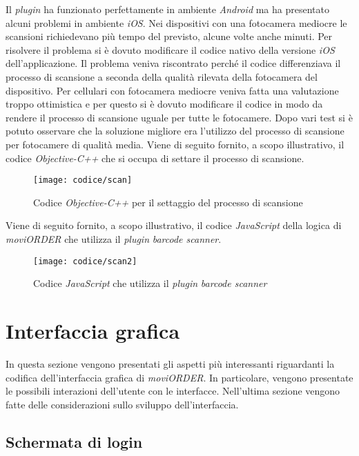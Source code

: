 Il \textit{plugin} ha funzionato perfettamente in ambiente \textit{Android} ma ha presentato alcuni problemi in ambiente \textit{iOS}. Nei dispositivi con una fotocamera mediocre le scansioni richiedevano più tempo del previsto, alcune volte anche minuti. Per risolvere il problema si è dovuto modificare il codice nativo della versione \textit{iOS} dell'applicazione. Il problema veniva riscontrato perché il codice differenziava il processo di scansione a seconda della qualità rilevata della fotocamera del dispositivo. Per cellulari con fotocamera mediocre veniva fatta una valutazione troppo ottimistica e per questo si è dovuto modificare il codice in modo da rendere il processo di scansione uguale per tutte le fotocamere. Dopo vari test si è potuto osservare che la soluzione migliore era l'utilizzo del processo di scansione per fotocamere di qualità media. Viene di seguito fornito, a scopo illustrativo, il codice \textit{Objective-C++} che si occupa di settare il processo di scansione.

\begin{figure}[!h] 
    \centering 
    \texttt{[image: codice/scan]} 
    \caption{Codice \textit{Objective-C++} per il settaggio del processo di scansione}
\end{figure}

\newpage

Viene di seguito fornito, a scopo illustrativo, il codice \textit{JavaScript} della logica di \textit{moviORDER} che utilizza il \textit{plugin} \textit{barcode scanner}.

\begin{figure}[!h] 
    \centering 
    \texttt{[image: codice/scan2]} 
    \caption{Codice \textit{JavaScript} che utilizza il \textit{plugin} \textit{barcode scanner}}
\end{figure}

\newpage

\section{Interfaccia grafica}

In questa sezione vengono presentati gli aspetti più interessanti riguardanti la codifica dell'interfaccia grafica di \textit{moviORDER}. In particolare, vengono presentate le possibili interazioni dell'utente con le interfacce. Nell'ultima sezione vengono fatte delle considerazioni sullo sviluppo dell'interfaccia.

\subsection{Schermata di login}

